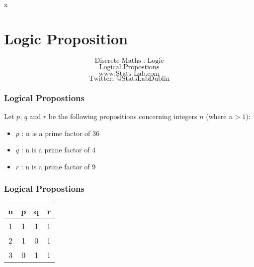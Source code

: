 \documentclass{beamer}
\begin{document}
\newpage

x


\section{Logic Proposition}
\begin{frame}
\Huge
\[\mbox{Discrete Maths :  Logic}\]
\[\mbox{Logical Propostions}\]
\bigskip
\LARGE
\[\mbox{www.Stats-Lab.com}\]
\[\mbox{Twitter: @StatsLabDublin}\]
\end{frame}
\begin{frame}
\frametitle{Logical Propostions}
\Large
Let $p$, $q$ and $r$ be the following propositions concerning integers $n$ (where $n>1$):

\begin{itemize}
\item $p$ : n is a prime factor of 36 %
\item $q$ : n is a prime factor of 4 %
\item $r$ : n is a prime factor of 9 %
\end{itemize}
\end{frame}
\begin{frame}
\frametitle{Logical Propostions}
\Large

\begin{center}
\begin{tabular}{|c||c|c|c|}
\hline 
\phantom{spa} \textbf{n} \phantom{spa}	& \phantom{spa}	\textbf{p} \phantom{spa}	& \phantom{spa}	\textbf{q} \phantom{spa}	& \phantom{spa}	\textbf{r} \phantom{spa}	\\ \hline \hline
1	&	1	&	1	&	1	\\ \hline
2	&	1	&	0	&	1	\\ \hline
3	&	0	&	1	&	1	\\ \hline
\hline 
\end{tabular} 
\end{center}
\end{frame}
\end{document}
